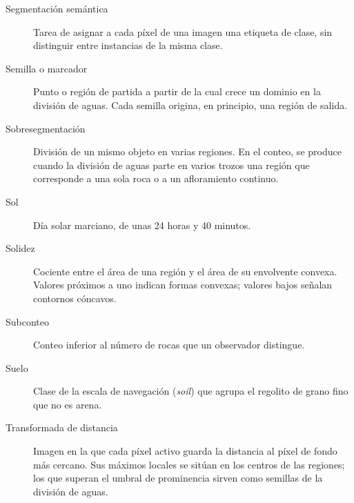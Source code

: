 {\begin{description}
  \item[Segmentación semántica] Tarea de asignar a cada píxel de una imagen una
    etiqueta de clase, sin distinguir entre instancias de la misma clase.

  \item[Semilla o marcador] Punto o región de partida a partir de la cual crece un
    dominio en la división de aguas. Cada semilla origina, en principio, una región
    de salida.

  \item[Sobresegmentación] División de un mismo objeto en varias regiones. En el
    conteo, se produce cuando la división de aguas parte en varios trozos una
    región que corresponde a una sola roca o a un afloramiento continuo.

  \item[Sol] Día solar marciano, de unas 24 horas y 40 minutos.

  \item[Solidez] Cociente entre el área de una región y el área de su envolvente
    convexa. Valores próximos a uno indican formas convexas; valores bajos señalan
    contornos cóncavos.

  \item[Subconteo] Conteo inferior al número de rocas que un observador distingue.

  \item[Suelo] Clase de la escala de navegación (\textit{soil}) que agrupa el
    regolito de grano fino que no es arena.

  \item[Transformada de distancia] Imagen en la que cada píxel activo guarda la
    distancia al píxel de fondo más cercano. Sus máximos locales se sitúan en los
    centros de las regiones; los que superan el umbral de prominencia sirven como
    semillas de la división de aguas.

\end{description}
}
\clearpage
